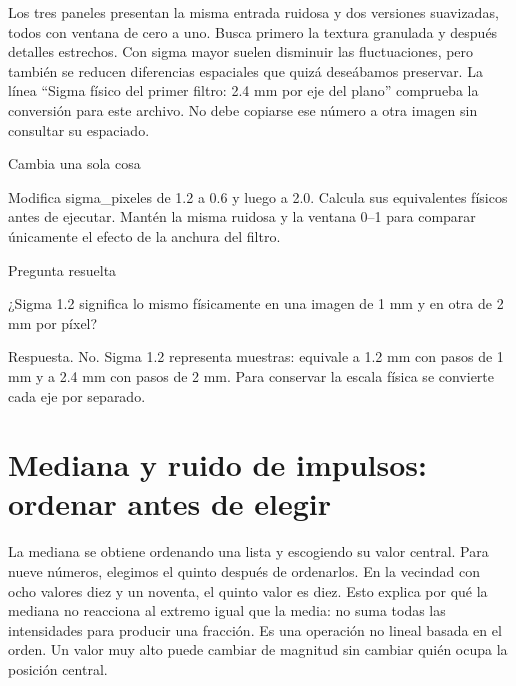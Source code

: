 
Los tres paneles presentan la misma entrada ruidosa y dos versiones suavizadas, todos con ventana de cero a uno. Busca primero la textura granulada y después detalles estrechos. Con sigma mayor suelen disminuir las fluctuaciones, pero también se reducen diferencias espaciales que quizá deseábamos preservar. La línea “Sigma físico del primer filtro: 2.4 mm por eje del plano” comprueba la conversión para este archivo. No debe copiarse ese número a otra imagen sin consultar su espaciado.



\begin{Practica}{Cambia una sola cosa}

Modifica sigma\_pixeles de 1.2 a 0.6 y luego a 2.0. Calcula sus equivalentes físicos antes de ejecutar. Mantén la misma ruidosa y la ventana 0–1 para comparar únicamente el efecto de la anchura del filtro.


\end{Practica}


\begin{Idea}{Pregunta resuelta}

¿Sigma 1.2 significa lo mismo físicamente en una imagen de 1 mm y en otra de 2 mm por píxel?


Respuesta. No. Sigma 1.2 representa muestras: equivale a 1.2 mm con pasos de 1 mm y a 2.4 mm con pasos de 2 mm. Para conservar la escala física se convierte cada eje por separado.


\end{Idea}

\clearpage

\section{Mediana y ruido de impulsos: ordenar antes de elegir}


La mediana se obtiene ordenando una lista y escogiendo su valor central. Para nueve números, elegimos el quinto después de ordenarlos. En la vecindad con ocho valores diez y un noventa, el quinto valor es diez. Esto explica por qué la mediana no reacciona al extremo igual que la media: no suma todas las intensidades para producir una fracción. Es una operación no lineal basada en el orden. Un valor muy alto puede cambiar de magnitud sin cambiar quién ocupa la posición central.



